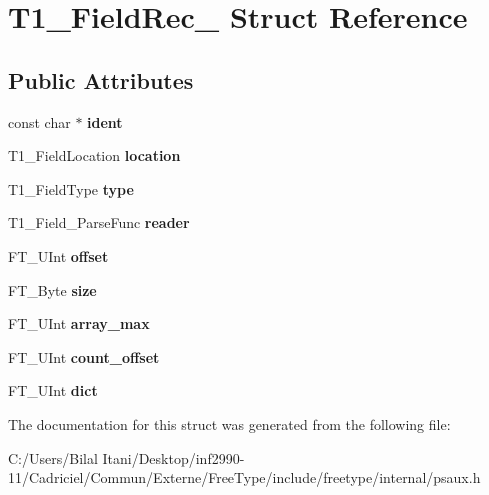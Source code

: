 \hypertarget{struct_t1___field_rec__}{}\section{T1\+\_\+\+Field\+Rec\+\_\+ Struct Reference}
\label{struct_t1___field_rec__}
\subsection*{Public Attributes}
\begin{DoxyCompactItemize}
\item 
const char $\ast$ {\bfseries ident}\hypertarget{struct_t1___field_rec___aaf70ae870eff9ea2b0518ef5e7301cfd}{}\label{struct_t1___field_rec___aaf70ae870eff9ea2b0518ef5e7301cfd}

\item 
T1\+\_\+\+Field\+Location {\bfseries location}\hypertarget{struct_t1___field_rec___a1e17111c68df523f82d20bddd822ca4d}{}\label{struct_t1___field_rec___a1e17111c68df523f82d20bddd822ca4d}

\item 
T1\+\_\+\+Field\+Type {\bfseries type}\hypertarget{struct_t1___field_rec___ad873155b36b72db9a1feaf2699fed1ce}{}\label{struct_t1___field_rec___ad873155b36b72db9a1feaf2699fed1ce}

\item 
T1\+\_\+\+Field\+\_\+\+Parse\+Func {\bfseries reader}\hypertarget{struct_t1___field_rec___a95e227de47c22bdadd77f797ff43d89d}{}\label{struct_t1___field_rec___a95e227de47c22bdadd77f797ff43d89d}

\item 
F\+T\+\_\+\+U\+Int {\bfseries offset}\hypertarget{struct_t1___field_rec___a41b503016f68291e061a2e29498982c1}{}\label{struct_t1___field_rec___a41b503016f68291e061a2e29498982c1}

\item 
F\+T\+\_\+\+Byte {\bfseries size}\hypertarget{struct_t1___field_rec___a8ce74a7ad2276abe8942883e7fbb1241}{}\label{struct_t1___field_rec___a8ce74a7ad2276abe8942883e7fbb1241}

\item 
F\+T\+\_\+\+U\+Int {\bfseries array\+\_\+max}\hypertarget{struct_t1___field_rec___a87f063bd3ad0dcfa30c00946d9f9cae8}{}\label{struct_t1___field_rec___a87f063bd3ad0dcfa30c00946d9f9cae8}

\item 
F\+T\+\_\+\+U\+Int {\bfseries count\+\_\+offset}\hypertarget{struct_t1___field_rec___a41d8814cc651d0276f8cfad751721326}{}\label{struct_t1___field_rec___a41d8814cc651d0276f8cfad751721326}

\item 
F\+T\+\_\+\+U\+Int {\bfseries dict}\hypertarget{struct_t1___field_rec___a509f7ddb1e0ffe050017daa29223e224}{}\label{struct_t1___field_rec___a509f7ddb1e0ffe050017daa29223e224}

\end{DoxyCompactItemize}


The documentation for this struct was generated from the following file\+:\begin{DoxyCompactItemize}
\item 
C\+:/\+Users/\+Bilal Itani/\+Desktop/inf2990-\/11/\+Cadriciel/\+Commun/\+Externe/\+Free\+Type/include/freetype/internal/psaux.\+h\end{DoxyCompactItemize}
